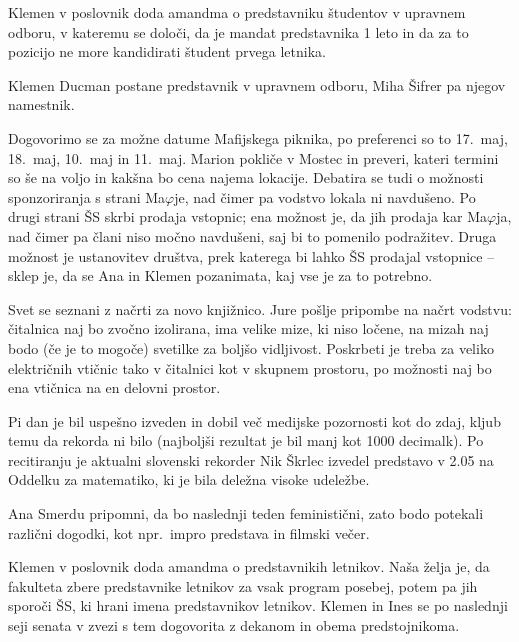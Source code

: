 \documentclass{seja}
\begin{document}
\begin{ad}
\item
Klemen v poslovnik doda amandma o predstavniku študentov v upravnem odboru, v kateremu se določi, da je mandat predstavnika 1 leto in da za to pozicijo ne more kandidirati študent prvega letnika.

\begin{sklep*}
Klemen Ducman postane predstavnik v upravnem odboru, Miha Šifrer pa njegov namestnik.
\end{sklep*}

\item
Dogovorimo se za možne datume Mafijskega piknika, po preferenci so to 17.~maj, 18.~maj, 10.~maj in 11.~maj. Marion pokliče v Mostec in preveri, kateri termini so še na voljo in kakšna bo cena najema lokacije. Debatira se tudi o možnosti sponzoriranja s strani Ma$\varphi$je, nad čimer pa vodstvo lokala ni navdušeno. Po drugi strani ŠS skrbi prodaja vstopnic; ena možnost je, da jih prodaja kar Ma$\varphi$ja, nad čimer pa člani niso močno navdušeni, saj bi to pomenilo podražitev. Druga možnost je ustanovitev društva, prek katerega bi lahko ŠS prodajal vstopnice --  sklep je, da se Ana in Klemen pozanimata, kaj vse je za to potrebno.

\item
Svet se seznani z načrti za novo knjižnico. Jure pošlje pripombe na načrt vodstvu: čitalnica naj bo zvočno izolirana, ima velike mize, ki niso ločene, na mizah naj bodo (če je to mogoče) svetilke za boljšo vidljivost. Poskrbeti je treba za veliko električnih vtičnic tako v čitalnici kot v skupnem prostoru, po možnosti naj bo ena vtičnica na en delovni prostor.

\item
Pi dan je bil uspešno izveden in dobil več medijske pozornosti kot do zdaj, kljub temu da rekorda ni bilo (najboljši rezultat je bil manj kot 1000 decimalk). Po recitiranju je aktualni slovenski rekorder Nik Škrlec izvedel predstavo v 2.05 na Oddelku za matematiko, ki je bila deležna visoke udeležbe.

Ana Smerdu pripomni, da bo naslednji teden feministični, zato bodo potekali različni dogodki, kot npr.~impro predstava in filmski večer.

\item
Klemen v poslovnik doda amandma o predstavnikih letnikov. Naša želja je, da fakulteta zbere predstavnike letnikov za vsak program posebej, potem pa jih sporoči ŠS, ki hrani imena predstavnikov letnikov. Klemen in Ines se po naslednji seji senata v zvezi s tem dogovorita z dekanom in obema predstojnikoma.


\end{ad}
\end{document}
